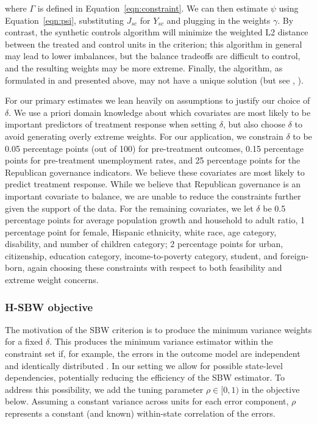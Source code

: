 where $\Gamma$ is defined in Equation~\ref{eqn:constraint}. We can then estimate $\psi$ using Equation~\ref{eqn:psi}, substituting $J_{sc}$ for $Y_{sc}$ and plugging in the weights $\gamma$. By contrast, the synthetic controls algorithm will minimize the weighted L2 distance between the treated and control units in the criterion; this algorithm in general may lead to lower imbalances, but the balance tradeoffs are difficult to control, and the resulting weights may be more extreme. Finally, the algorithm, as formulated in \cite{abadie2010synthetic} and presented above, may not have a unique solution (but see \cite{ben2018augmented}, \cite{becker2017cross}).

For our primary estimates we lean heavily on assumptions to justify our choice of $\delta$. We use a priori domain knowledge about which covariates are most likely to be important predictors of treatment response when setting $\delta$, but also choose $\delta$ to avoid generating overly extreme weights. For our application, we constrain $\delta$ to be 0.05 percentage points (out of 100) for pre-treatment outcomes, 0.15 percentage points for pre-treatment unemployment rates, and 25 percentage points for the Republican governance indicators. We believe these covariates are most likely to predict treatment response. While we believe that Republican governance is an important covariate to balance, we are unable to reduce the constraints further given the support of the data. For the remaining covariates, we let $\delta$ be 0.5 percentage points for average population growth and household to adult ratio, 1 percentage point for female, Hispanic ethnicity, white race, age category, disability, and number of children category; 2 percentage points for urban, citizenship, education category, income-to-poverty category, student, and foreign-born, again choosing these constraints with respect to both feasibility and extreme weight concerns. 

\subsubsection{H-SBW objective}

The motivation of the SBW criterion is to produce the minimum variance weights for a fixed $\delta$. This produces the minimum variance estimator within the constraint set if, for example, the errors in the outcome model are independent and identically distributed \cite{zubizarreta2015stable}. In our setting we allow for possible state-level dependencies, potentially reducing the efficiency of the SBW estimator. To address this possibility, we add the tuning parameter $\rho \in [0, 1)$ in the objective below. Assuming a constant variance across units for each error component, $\rho$ represents a constant (and known) within-state correlation of the errors. 

